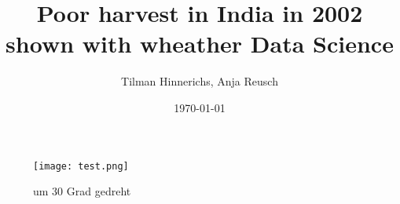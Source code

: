 \documentclass[10pt]{beamer}
\title{Poor harvest in India in 2002 shown with wheather Data Science}
\author{Tilman Hinnerichs, Anja Reusch}
\institute{Bertelsmann Data Science Scholarship Program}
\date{\today}
\begin{document}
\begin{frame}
	\titlepage
\end{frame}	
	
	\begin{figure}[ht]
		\centering
		\texttt{[image: test.png]}
		\caption{um 30 Grad gedreht}
		\label{fig1}
	\end{figure}

\begin{frame}
	
\end{frame}
\end{document}
